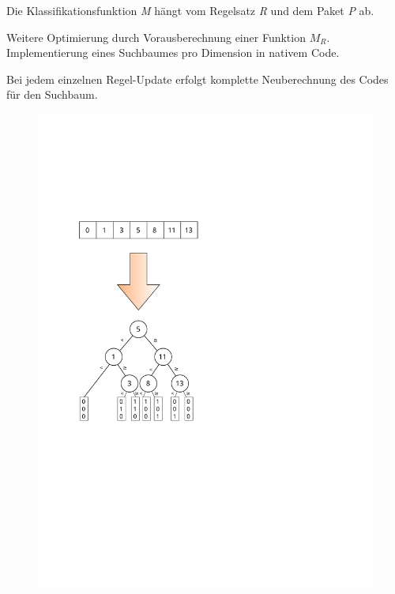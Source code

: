 \documentclass[xcolor=x11names,compress]{beamer}
\renewcommand{\(}{\begin{columns}}
\renewcommand{\)}{\end{columns}}
\newcommand{\<}[1]{\begin{column}{#1}}
\renewcommand{\>}{\end{column}}
\begin{document}
\begin{frame}
  \begin{tcolorbox}[colback=yellow!5!white,colframe=yellow!75!black,title=Erinnerung,drop fuzzy shadow]
  Die Klassifikationsfunktion \textit{M} hängt vom Regelsatz \textit{R} und dem Paket \textit{P} ab.
  \end{tcolorbox}
  \pause
  \begin{tcolorbox}[colback=blue!5!white,colframe=blue!75!black,title=Idee,drop fuzzy shadow]
  Weitere Optimierung durch Vorausberechnung einer Funktion $M_R$.\\
  Implementierung eines Suchbaumes pro Dimension in nativem Code.
  \end{tcolorbox}
  \pause %
  \begin{tcolorbox}[colback=red!5!white,colframe=red!75!black,title=Nachteil,drop fuzzy shadow]
  Bei jedem einzelnen Regel-Update erfolgt komplette Neuberechnung des Codes für den Suchbaum.
  \end{tcolorbox}
\end{frame}

\begin{frame}
  \begin{figure}
  \centering
  \includegraphics[scale=0.6]{figures/array_to_tree}
  \end{figure}
\end{frame}
\end{document}
